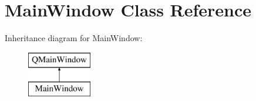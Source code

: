 \hypertarget{class_main_window}{}\section{Main\+Window Class Reference}
\label{class_main_window}
Inheritance diagram for Main\+Window\+:\begin{figure}[H]
\begin{center}
\leavevmode
\includegraphics[height=2.000000cm]{class_main_window}
\end{center}
\end{figure}
